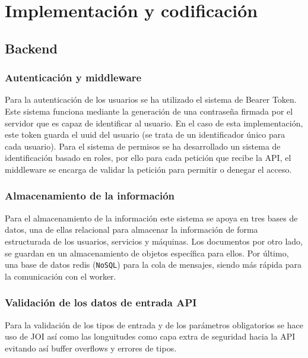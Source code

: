 \section{Implementación y codificación}
\subsection{Backend}

\subsubsection{Autenticación y middleware}
Para la autenticación de los usuarios se ha utilizado el sistema de Bearer Token. Este sistema funciona mediante la generación de una contraseña firmada por el servidor que es capaz de identificar al usuario. En el caso de esta implementación, este token guarda el uuid del usuario (se trata de un identificador único para cada usuario). Para el sistema de permisos se ha desarrollado un sistema de identificación basado en roles, por ello para cada petición que recibe la API, el middleware se encarga de validar la petición para permitir o denegar el acceso. 

\subsubsection{Almacenamiento de la información}
Para el almacenamiento de la información este sistema se apoya en tres bases de datos, una de ellas relacional para almacenar la información de forma estructurada de los usuarios, servicios y máquinas. Los documentos por otro lado, se guardan en un almacenamiento de objetos específica para ellos. Por último, una base de datos redis (\texttt{NoSQL}) para la cola de mensajes, siendo más rápida para la comunicación con el worker.\cite{thepower_redis}  

\subsubsection{Validación de los datos de entrada API}
Para la validación de los tipos de entrada y de los parámetros obligatorios se hace uso de JOI así como las longuitudes como capa extra de seguridad hacia la API evitando así buffer overflows y errores de tipos.

